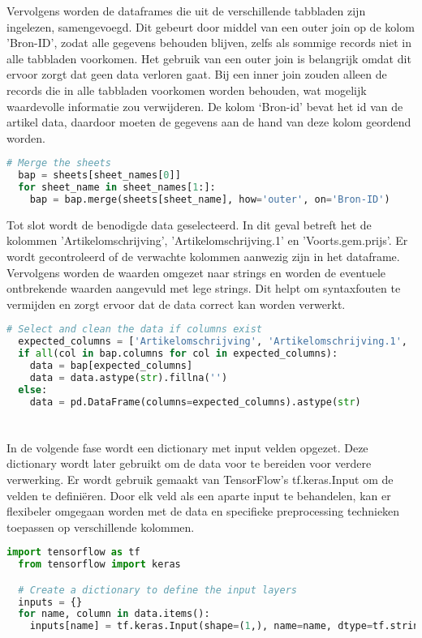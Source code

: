 Vervolgens worden de dataframes die uit de verschillende tabbladen zijn ingelezen, samengevoegd. Dit gebeurt door middel van een outer join op de kolom 'Bron-ID', zodat alle gegevens behouden blijven, zelfs als sommige records niet in alle tabbladen voorkomen. Het gebruik van een outer join is belangrijk omdat dit ervoor zorgt dat geen data verloren gaat. Bij een inner join zouden alleen de records die in alle tabbladen voorkomen worden behouden, wat mogelijk waardevolle informatie zou verwijderen. De kolom ‘Bron-id’ bevat het id van de artikel data, daardoor moeten de gegevens aan de hand van deze kolom geordend worden.
\begin{lstlisting}[language=Python, caption={Mergen van drie dataframes}]
  # Merge the sheets
  bap = sheets[sheet_names[0]]
  for sheet_name in sheet_names[1:]:
    bap = bap.merge(sheets[sheet_name], how='outer', on='Bron-ID')
\end{lstlisting}

Tot slot wordt de benodigde data geselecteerd. In dit geval betreft het de kolommen 'Artikelomschrijving', 'Artikelomschrijving.1' en 'Voorts.gem.prijs'. Er wordt gecontroleerd of de verwachte kolommen aanwezig zijn in het dataframe. Vervolgens worden de waarden omgezet naar strings en worden de eventuele ontbrekende waarden aangevuld met lege strings. Dit helpt om syntaxfouten te vermijden en zorgt ervoor dat de data correct kan worden verwerkt.
\begin{lstlisting}[language=Python, caption={Selecteren en cleanen van de data}]
  # Select and clean the data if columns exist
  expected_columns = ['Artikelomschrijving', 'Artikelomschrijving.1', 'Voorts.gem.prijs']
  if all(col in bap.columns for col in expected_columns):
    data = bap[expected_columns]
    data = data.astype(str).fillna('')
  else:
    data = pd.DataFrame(columns=expected_columns).astype(str)
\end{lstlisting}

\section{}%
\label{sec:inputPreparatiePOC}

In de volgende fase wordt een dictionary met input velden opgezet. Deze dictionary wordt later gebruikt om de data voor te bereiden voor verdere verwerking. Er wordt gebruik gemaakt van TensorFlow's tf.keras.Input om de velden te definiëren. Door elk veld als een aparte input te behandelen, kan er flexibeler omgegaan worden met de data en specifieke preprocessing technieken toepassen op verschillende kolommen.
\begin{lstlisting}[language=Python, caption={Opzetten van een dictionary}]
  import tensorflow as tf
  from tensorflow import keras

  # Create a dictionary to define the input layers
  inputs = {}
  for name, column in data.items():
    inputs[name] = tf.keras.Input(shape=(1,), name=name, dtype=tf.string)
\end{lstlisting}

